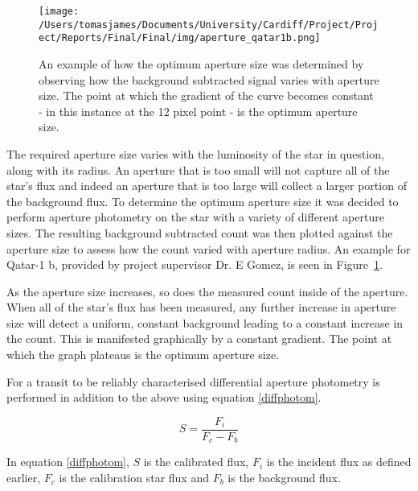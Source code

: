 \documentclass{report}
\begin{document}
\begin{figure}[H]
\centering
    \texttt{[image: /Users/tomasjames/Documents/University/Cardiff/Project/Project/Reports/Final/Final/img/aperture\_qatar1b.png]}
\caption[An example of how the optimum aperture size was determined by observing how the background subtracted signal varies with aperture size. The point at which the gradient of the curve becomes constant - in this instance at the 12 pixel point - is the optimum aperture size.]{An example of how the optimum aperture size was determined by observing how the background subtracted signal varies with aperture size. The point at which the gradient of the curve becomes constant - in this instance at the 12 pixel point - is the optimum aperture size.} \label{qatar1b}
\end{figure}

The required aperture size varies with the luminosity of the star in question, along with its radius. An aperture that is too small will not capture all of the star's flux and indeed an aperture that is too large will collect a larger portion of the background flux. To determine the optimum aperture size it was decided to perform aperture photometry on the star with a variety of different aperture sizes.  The resulting background subtracted count was then plotted against the aperture size to assess how the count varied with aperture radius. An example for Qatar-1 b, provided by project supervisor Dr. E Gomez, is seen in Figure~\ref{qatar1b}.

As the aperture size increases, so does the measured count inside of the aperture. When all of the star's flux has been measured, any further increase in aperture size will detect a uniform, constant background leading to a constant increase in the count. This is manifested graphically by a constant gradient. The point at which the graph plateaus is the optimum aperture size.

For a transit to be reliably characterised differential aperture photometry is performed in addition to the above using equation \ref{diffphotom}. 

\begin{equation} \label{diffphotom}
    S = \frac{F_{i}}{F_{c}-F_{b}}
\end{equation}

In equation \ref{diffphotom}, $S$ is the calibrated flux, $F_{i}$ is the incident flux as defined earlier, $F_{c}$ is the calibration star flux and $F_{b}$ is the background flux.
\end{document}

